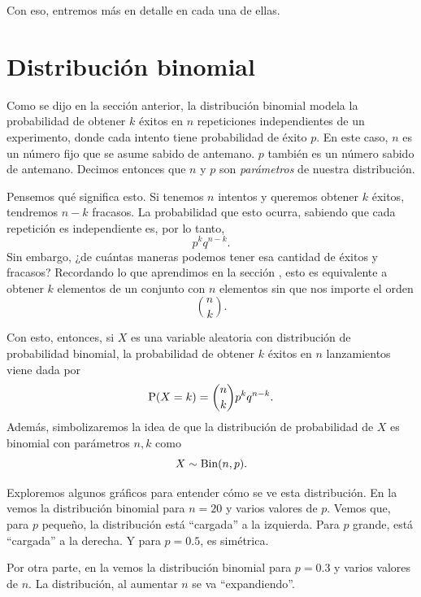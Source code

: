 Con eso, entremos más en detalle en cada una de ellas.

\section{Distribución binomial}

Como se dijo en la sección anterior, la distribución binomial modela la probabilidad de obtener \(k\) éxitos en \(n\) repeticiones independientes de un experimento, donde cada intento tiene probabilidad de éxito \(p\). En este caso, \(n\) es un número fijo que se asume sabido de antemano. \(p\) también es un número sabido de antemano. Decimos entonces que \(n\) y \(p\) son \emph{parámetros} de nuestra distribución. 

Pensemos qué significa esto. Si tenemos \(n\) intentos y queremos obtener \(k\) éxitos, tendremos \(n-k\) fracasos. La probabilidad que esto ocurra, sabiendo que cada repetición es independiente es, por lo tanto, \[p^kq^{n-k}.\] Sin embargo, ¿de cuántas maneras podemos tener esa cantidad de éxitos y fracasos? Recordando lo que aprendimos en la sección , esto es equivalente a obtener \(k\) elementos de un conjunto con \(n\) elementos sin que nos importe el orden \[\binom{n}{k}.\]

Con esto, entonces, si \(X\) es una variable aleatoria con distribución de probabilidad binomial, la probabilidad de obtener \(k\) éxitos en \(n\) lanzamientos viene dada por \[\operatorname{P}(X=k) = \binom{n}{k}p^kq^{n-k}.\] Además, simbolizaremos la idea de que la distribución de probabilidad de \(X\) es binomial con parámetros \(n, k\) como \[X\sim\operatorname{Bin}(n, p).\]

Exploremos algunos gráficos para entender cómo se ve esta distribución. En la   vemos la distribución binomial para \(n=20\) y varios valores de \(p\). Vemos que, para \(p\) pequeño, la distribución está \enquote{cargada} a la izquierda. Para \(p\) grande, está \enquote{cargada} a la derecha. Y para \(p=0.5\), es simétrica.

Por otra parte, en la  vemos la distribución binomial para \(p=0.3\) y varios valores de \(n\). La distribución, al aumentar \(n\) se va \enquote{expandiendo}.


